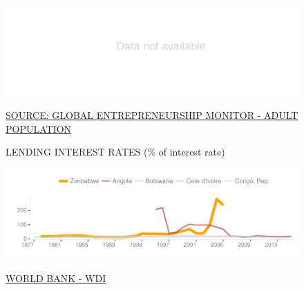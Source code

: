 \documentclass{article}\usepackage[]{graphicx}\usepackage[]{color}
\makeatletter
\def\maxwidth{ %
  \ifdim\Gin@nat@width>\linewidth
    \linewidth
  \else
    \Gin@nat@width
  \fi
}
\makeatother
\begin{document}
\begin{figure}
\begin{minipage}[c]{0.95\textwidth}
\begin{minipage}[c]{0.95\textwidth}
\begin{minipage}[c]{0.49\textwidth}
{\centering \includegraphics[width=\maxwidth]{figure/line_chart_Finance1-1} 

}



      \vspace*{-0.2cm} 
      \scriptsize{\href{http://www.gemconsortium.org/data/sets}{\textcolor[HTML]{22A6F5}{SOURCE: GLOBAL ENTREPRENEURSHIP MONITOR - ADULT POPULATION}}}
    \end{minipage}
    \begin{minipage}[c]{0.49\textwidth} %
      \small{\textcolor[HTML]{818181}{LENDING INTEREST RATES \footnotesize(\% of interest rate)}}


{\centering \includegraphics[width=\maxwidth]{figure/line_chart_Finance2-1} 

}



      \vspace*{-0.2cm} 
      \scriptsize{\href{http://data.worldbank.org}{\textcolor[HTML]{22A6F5}{WORLD BANK - WDI}}}
    \end{minipage}
  \end{minipage}  
  

\end{minipage}
\end{figure}
\end{document}
